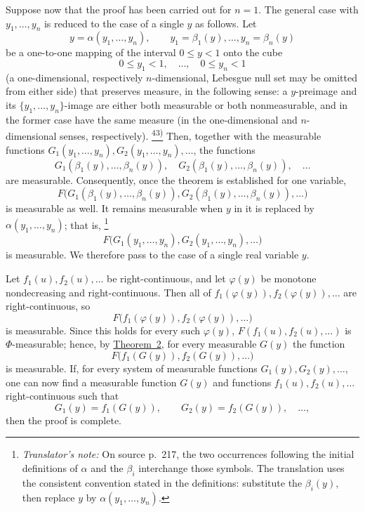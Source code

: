\documentclass[12pt,b5paper,twoside]{article}
\newcommand{\noteref}[1]{%
  \hyperlink{note:#1}{\textsuperscript{#1)}}}
\newcommand{\translatorfootnote}[2]{%
  \begingroup
  \renewcommand{\thefootnote}{#1}%
  \footnote{\hspace{0.8em}\textit{Translator's note:} #2}%
  \endgroup}
\begin{document}
Suppose now that the proof has been carried out for $n=1$.  The general case with
$y_1,\ldots,y_n$ is reduced to the case of a single $y$ as follows.  Let
\[
 y=\alpha(y_1,\ldots,y_n),
 \qquad y_1=\beta_1(y),\ldots,y_n=\beta_n(y)
\]
be a one-to-one mapping of the interval $0\leq y<1$ onto the cube
\[
 0\leq y_1<1,\quad\ldots,\quad 0\leq y_n<1
\]
(a one-dimensional, respectively $n$-dimensional, Lebesgue null set may be omitted
from either side) that preserves measure, in the following sense: a $y$-preimage and
its $\{y_1,\ldots,y_n\}$-image are either both measurable or both nonmeasurable, and
in the former case have the same measure (in the one-dimensional and
$n$-dimensional senses, respectively).\noteref{43}  Then, together with the measurable
functions $G_1(y_1,\ldots,y_n),G_2(y_1,\ldots,y_n),\ldots$, the functions
\[
 G_1(\beta_1(y),\ldots,\beta_n(y)),
 \quad G_2(\beta_1(y),\ldots,\beta_n(y)),\quad\ldots
\]
are measurable.  Consequently, once the theorem is established for one variable,
\[
 F\bigl(G_1(\beta_1(y),\ldots,\beta_n(y)),
         G_2(\beta_1(y),\ldots,\beta_n(y)),\ldots\bigr)
\]
is measurable as well.  It remains measurable when $y$ in it is replaced by
$\alpha(y_1,\ldots,y_n)$; that is,\translatorfootnote{T11}{On source p.~217, the two
occurrences following the initial definitions of $\alpha$ and the $\beta_i$
interchange those symbols.  The translation uses the consistent convention stated
in the definitions: substitute the $\beta_i(y)$, then replace $y$ by
$\alpha(y_1,\ldots,y_n)$.}
\[
 F\bigl(G_1(y_1,\ldots,y_n),G_2(y_1,\ldots,y_n),\ldots\bigr)
\]
is measurable.  We therefore pass to the case of a single real variable $y$.

Let $f_1(u),f_2(u),\ldots$ be right-continuous, and let $\varphi(y)$ be
monotone nondecreasing and right-continuous.  Then all of
$f_1(\varphi(y)),f_2(\varphi(y)),\ldots$ are right-continuous, so
\[
 F\bigl(f_1(\varphi(y)),f_2(\varphi(y)),\ldots\bigr)
\]
is measurable.  Since this holds for every such $\varphi(y)$,
$F(f_1(u),f_2(u),\ldots)$ is $\Phi$-measurable; hence, by
\hyperref[thm:2]{Theorem~2}, for every measurable $G(y)$ the function
\[
 F\bigl(f_1(G(y)),f_2(G(y)),\ldots\bigr)
\]
is measurable.  If, for every system of measurable functions
$G_1(y),G_2(y),\ldots$, one can now find a measurable function $G(y)$ and functions
$f_1(u),f_2(u),\ldots$ right-continuous such that
\[
 G_1(y)=f_1(G(y)),\qquad G_2(y)=f_2(G(y)),\quad\ldots,
\]
then the proof is complete.
\end{document}
